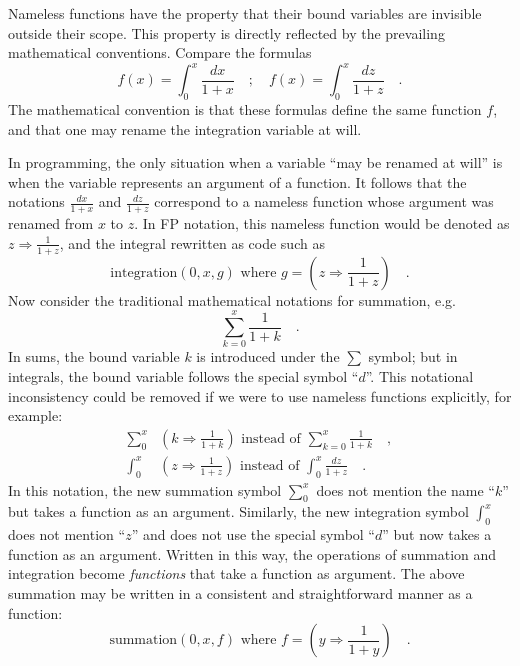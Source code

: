 Nameless functions have the property that their bound variables are
invisible outside their scope. This property is directly reflected
by the prevailing mathematical conventions. Compare the formulas
\[
f\left(x\right)=\int_{0}^{x}\frac{dx}{1+x}\quad;\quad f\left(x\right)=\int_{0}^{x}\frac{dz}{1+z}\quad.
\]
The mathematical convention is that these formulas define the same
function $f$, and that one may rename the integration variable at
will.

In programming, the only situation when a variable ``may be renamed
at will'' is when the variable represents an argument of a function.
It follows that the notations $\frac{dx}{1+x}$ and $\frac{dz}{1+z}$
correspond to a nameless function whose argument was renamed from
$x$ to $z$. In FP notation, this nameless function would be denoted
as $z\Rightarrow\frac{1}{1+z}$, and the integral rewritten as code
such as
\[
\text{integration}\left(0,x,g\right)\text{ where }g=\left(z\Rightarrow\frac{1}{1+z}\right)\quad.
\]
Now consider the traditional mathematical notations for summation,
e.g.
\[
\sum_{k=0}^{x}\frac{1}{1+k}\quad.
\]
In sums, the bound variable $k$ is introduced under the $\sum$ symbol;
but in integrals, the bound variable follows the special symbol ``$d$''.
This notational inconsistency could be removed if we were to use nameless
functions explicitly, for example:
\begin{align*}
\sum_{0}^{x} & \left(k\Rightarrow\frac{1}{1+k}\right)\text{ instead of }\sum_{k=0}^{x}\frac{1}{1+k}\quad,\\
\int_{0}^{x} & \left(z\Rightarrow\frac{1}{1+z}\right)\text{ instead of }\int_{0}^{x}\frac{dz}{1+z}\quad.
\end{align*}
In this notation, the new summation symbol $\sum_{0}^{x}$ does not
mention the name “$k$” but takes a function as an argument. Similarly,
the new integration symbol $\int_{0}^{x}$ does not mention ``$z$''
and does not use the special symbol ``$d$'' but now takes a function
as an argument. Written in this way, the operations of summation and
integration become \emph{functions} that take a function as argument.
The above summation may be written in a consistent and straightforward
manner as a function:
\[
\text{summation}\left(0,x,f\right)\text{ where }f=\left(y\Rightarrow\frac{1}{1+y}\right)\quad.
\]


